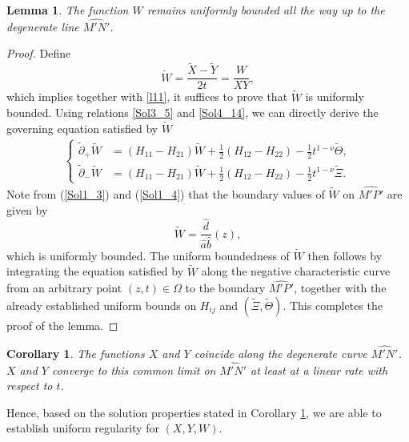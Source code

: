 \documentclass[3p,11pt]{elsarticle}
\numberwithin{equation}{section}
\newtheorem{lemma}{Lemma}[section]
\newtheorem{corollary}{Corollary}[section]
\begin{document}
\begin{lemma}\label{Sol_3_l4}
    The function $W$ remains uniformly bounded all the way up to the degenerate line $\widehat{M'N'}$.
\end{lemma}
\begin{proof}
    Define
    \begin{equation}\label{Sol4_23}
        \widetilde W=\frac{\widetilde X-\widetilde Y}{2t}=\frac{W}{ X Y},
    \end{equation}
    which implies together with \eqref{l11}, it suffices to prove that $\widetilde W$ is uniformly bounded. Using relations \eqref{Sol3_5} and \eqref{Sol4_14}, we can directly derive the governing equation satisfied by $\widetilde W$
    \begin{equation}\label{Sol4_24}
      \begin{split}
          \begin{cases}
               \tilde \partial_+ \widetilde W&=(H_{11}-H_{21})\widetilde W+\frac{1}{2}(H_{12}-H_{22})-\frac{1}{2}t^{1-\nu}\widetilde \Theta,\\
               \tilde \partial_- \widetilde W&=(H_{11}-H_{21})\widetilde W+\frac{1}{2}(H_{12}-H_{22})-\frac{1}{2}t^{1-\nu}\widetilde \Xi.
          \end{cases}
      \end{split}
    \end{equation}
   Note from (\ref{Sol1_3}) and (\ref{Sol1_4}) that the boundary values of $\widetilde W$ on $\widehat{M'P'}$ are given by 
   \begin{equation*}\label{Sol4_25}
       \widetilde W=\frac{\hat d}{\hat a\hat b}(z),
   \end{equation*}
   which is uniformly bounded. The uniform boundedness of $\widetilde W$ then follows by integrating the equation satisfied by $\widetilde W$ along the negative characteristic curve from an arbitrary point $(z,t)\in \Omega$ to the boundary $\widehat{M'P'}$, together with the already established uniform bounds on $H_{ij}$ and $(\widetilde\Xi, \widetilde\Theta)$. This completes the proof of the lemma.
\end{proof}
\begin{corollary}\label{Sol_3_c1}
The functions $X$ and $Y$ coincide along the degenerate curve $\widehat{M'N'}$. $X$ and $Y$ converge to this common limit on $\widehat{M'N'}$ at least at a linear rate with respect to $t$.
\end{corollary}
Hence, based on the solution properties stated in Corollary \ref{Sol_3_c1}, we are able to establish uniform regularity for $( X, Y, W)$.
\end{document}
